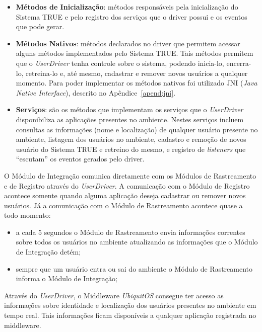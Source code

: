 \begin{itemize}
	\item \textbf{Métodos de Inicialização}: métodos responsáveis pela inicialização do Sistema TRUE e pelo registro dos serviços que o driver possui e os eventos que pode gerar.

	\item \textbf{Métodos Nativos}: métodos declarados no driver que permitem acessar alguns métodos implementados pelo Sistema TRUE. Tais métodos permitem que o \textit{UserDriver} tenha controle sobre o sistema, podendo inicia-lo, encerra-lo, retreina-lo e, até mesmo, cadastrar e remover novos usuários a qualquer momento. Para poder implementar os métodos nativos foi utilizado JNI (\textit{Java Native Interface}), descrito no Apêndice~\ref{apend:jni}.

	\item \textbf{Serviços}: são os métodos que implementam os serviços que o \textit{UserDriver} disponibiliza as aplicações presentes no ambiente. Nestes serviços incluem consultas as informações (nome e localização) de qualquer usuário presente no ambiente, listagem dos usuários no ambiente, cadastro e remoção de novos usuário do Sistema TRUE e retreino do mesmo, e registro de \textit{listeners} que ``escutam'' os eventos gerados pelo driver.
\end{itemize}

O Módulo de Integração comunica diretamente com os Módulos de Rastreamento e de Registro através do \textit{UserDriver}. A comunicação com o Módulo de Registro acontece somente quando alguma aplicação deseja cadastrar ou remover novos usuários. Já a comunicação com o Módulo de Rastreamento acontece quase a todo momento: 

	\begin{itemize}
		\item a cada 5 segundos o Módulo de Rastreamento envia informações correntes sobre todos os usuários no ambiente atualizando as informações que o Módulo de Integração detém;
		\item sempre que um usuário entra ou sai do ambiente o Módulo de Rastreamento informa o Módulo de Integração;
	\end{itemize} 

Através do \textit{UserDriver}, o Middleware \textit{UbiquitOS} consegue ter acesso as informações sobre identidade e localização dos usuários presentes no ambiente em tempo real. Tais informações ficam disponíveis a qualquer aplicação registrada no middleware. 
